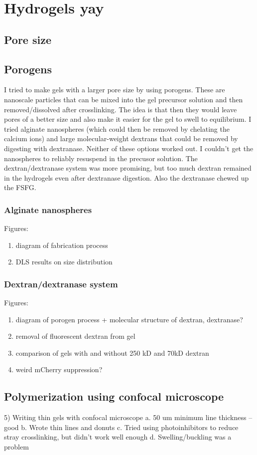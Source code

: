 \chapter{Hydrogels yay}\label{ch03}
\section{Pore size}
\section{Porogens}
I tried to make gels with a larger pore size by using porogens.  These are nanoscale particles that can be mixed into the gel precursor solution and then removed/dissolved after crosslinking.  The idea is that then they would leave pores of a better size and also make it easier for the gel to swell to equilibrium.  I tried alginate nanospheres (which could then be removed by chelating the calcium ions) and large molecular-weight dextrans that could be removed by digesting with dextranase.  Neither of these options worked out.  I couldn't get the nanospheres to reliably resuspend in the precusor solution.  The dextran/dextranase system was more promising, but too much dextran remained in the hydrogels even after dextranase digestion.  Also the dextranase chewed up the FSFG.
\subsection{Alginate nanospheres}
Figures:
\begin{enumerate}
\item diagram of fabrication process
\item DLS results on size distribution
\end{enumerate}
\subsection{Dextran/dextranase system}
Figures:
\begin{enumerate}
\item diagram of porogen process + molecular structure of dextran, dextranase?
\item removal of fluorescent dextran from gel
\item comparison of gels with and without 250 kD and 70kD dextran
\item weird mCherry suppression?
\end{enumerate}
\section{Polymerization using confocal microscope}
5)	Writing thin gels with confocal microscope
a.	50 um minimum line thickness – good
b.	Wrote thin lines and donuts
c.	Tried using photoinhibitors to reduce stray crosslinking, but didn’t work well enough
d.	Swelling/buckling was a problem
